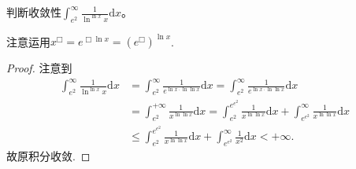 \documentclass[../../main.tex]{subfiles}%
\begin{document}
\begin{example}
判断收敛性\(\int_{e^2}^{\infty}\frac{1}{\ln^{\ln x}x}\mathrm{d}x\)。 
\end{example}
\begin{note}
注意运用\(x^{\Box}=e^{\Box\ln x}=(e^{\Box})^{\ln x}\).
\end{note}
\begin{proof}
注意到
\begin{align*}
\int_{e^2}^{\infty}\frac{1}{\ln^{\ln x}x}\mathrm{d}x&=\int_{e^2}^{\infty}\frac{1}{e^{\ln x\cdot \ln\ln x}}\mathrm{d}x=\int_{e^2}^{\infty}\frac{1}{e^{\ln x\cdot \ln\ln x}}\mathrm{d}x\\
&=\int_{e^2}^{+\infty}\frac{1}{x^{\ln\ln x}}\mathrm{d}x=\int_{e^2}^{e^{e^2}}\frac{1}{x^{\ln\ln x}}\mathrm{d}x+\int_{e^{e^2}}^{\infty}\frac{1}{x^{\ln\ln x}}\mathrm{d}x\\
&\leqslant \int_{e^2}^{e^{e^2}}\frac{1}{x^{\ln\ln x}}\mathrm{d}x+\int_{e^{e^2}}^{\infty}\frac{1}{x^2}\mathrm{d}x<+\infty.
\end{align*}
故原积分收敛. 
\end{proof}
\end{document}
